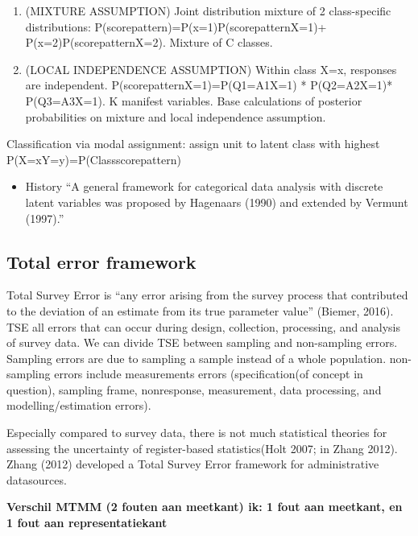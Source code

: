 \documentclass[
]{article}
\providecommand{\tightlist}{%
  \setlength{\itemsep}{0pt}\setlength{\parskip}{0pt}}
\begin{document}
\begin{enumerate}
\def\labelenumi{\arabic{enumi}.}
\tightlist
\item
  (MIXTURE ASSUMPTION) Joint distribution mixture of 2 class-specific
  distributions: P(scorepattern)=P(x=1)P(scorepattern\textbar X=1)+
  P(x=2)P(scorepattern\textbar X=2). Mixture of C classes.
\item
  (LOCAL INDEPENDENCE ASSUMPTION) Within class X=x, responses are
  independent. P(scorepattern\textbar X=1)=P(Q1=A1\textbar X=1) *
  P(Q2=A2\textbar X=1)* P(Q3=A3\textbar X=1). K manifest variables. Base
  calculations of posterior probabilities on mixture and local
  independence assumption.
\end{enumerate}

Classification via modal assignment: assign unit to latent class with
highest P(X=x\textbar Y=y)=P(Class\textbar scorepattern)

\begin{itemize}
\tightlist
\item
  History ``A general framework for categorical data analysis with
  discrete latent variables was proposed by Hagenaars (1990) and
  extended by Vermunt (1997).''
\end{itemize}

\hypertarget{total-error-framework}{%
\subsection{Total error framework}\label{total-error-framework}}

Total Survey Error is ``any error arising from the survey process that
contributed to the deviation of an estimate from its true parameter
value'' (Biemer, 2016). TSE all errors that can occur during design,
collection, processing, and analysis of survey data. We can divide TSE
between sampling and non-sampling errors. Sampling errors are due to
sampling a sample instead of a whole population. non-sampling errors
include measurements errors (specification(of concept in question),
sampling frame, nonresponse, measurement, data processing, and
modelling/estimation errors).

Especially compared to survey data, there is not much statistical
theories for assessing the uncertainty of register-based statistics(Holt
2007; in Zhang 2012). Zhang (2012) developed a Total Survey Error
framework for administrative datasources.

\textbf{Verschil MTMM (2 fouten aan meetkant) ik: 1 fout aan meetkant,
en 1 fout aan representatiekant}
\end{document}
